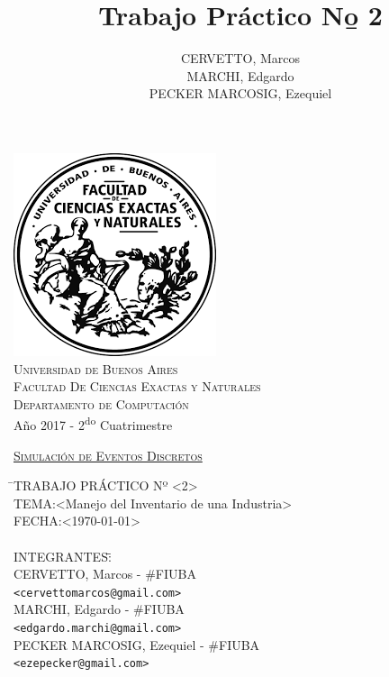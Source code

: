 \documentclass[10pt]{article}
\title{Trabajo Práctico N\b o 2}
\author{CERVETTO, Marcos\\MARCHI, Edgardo\\PECKER MARCOSIG, Ezequiel}
\begin{document}
%
%
\pagestyle{fancy}
\chead{}
\lfoot{}
\cfoot{}
\rfoot{\thepage}

%
%
\begin{titlepage}

\thispagestyle{empty}

\begin{center}
\includegraphics[scale=0.7]{img/fcenuba}\\
\large{\textsc{Universidad de Buenos Aires}}\\
\large{\textsc{Facultad De Ciencias Exactas y Naturales}}\\
\large{\textsc{Departamento de Computación}}\\
\small{Año 2017 - 2\textsuperscript{do} Cuatrimestre}
\end{center}

\vfill

\begin{center} %
\Large{\underline{\textsc{Simulación de Eventos Discretos}}}
\end{center}

\vfill

\begin{tabbing}
\hspace{2cm}\=\+TRABAJO PRÁCTICO Nº \textless{}2\textgreater{}\\
	TEMA:\textless{}Manejo del Inventario de una Industria\textgreater{}\\
	FECHA:\textless{\today}\textgreater{}\\
\\
	INTEGRANTES:\hspace{-1cm}\=\+\hspace{1cm}\=\hspace{6cm}\=\\
		CERVETTO, Marcos	\>\>- \#FIUBA\\
			\>\footnotesize{\verb!<cervettomarcos@gmail.com>!}\\
		MARCHI, Edgardo	\>\>- \#FIUBA\\
			\>\footnotesize{\verb!<edgardo.marchi@gmail.com>!}\\
		PECKER MARCOSIG, Ezequiel	\>\>- \#FIUBA\\
			\>\footnotesize{\verb!<ezepecker@gmail.com>!}\\
\end{tabbing}


\end{titlepage}
\end{document}
